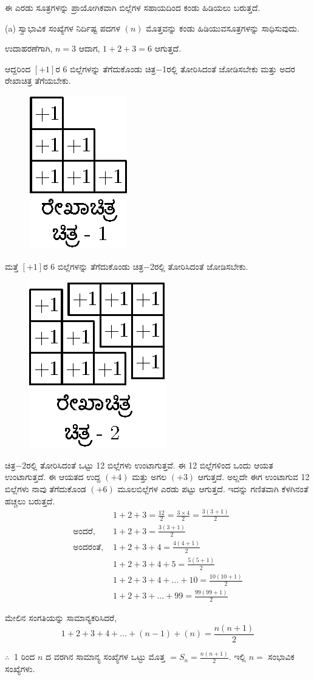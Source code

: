\eject

ಈ ಎರಡು ಸೂತ್ರಗಳನ್ನು ಪ್ರಾಯೋಗಿಕವಾಗಿ ಬಿಲ್ಲೆಗಳ ಸಹಾಯದಿಂದ ಕಂಡು ಹಿಡಿ\break ಯಲು ಬರುತ್ತದೆ. 

(a) ಸ್ವಾಭಾವಿಕ ಸಂಖ್ಯೆಗಳ ನಿರ್ದಿಷ್ಟ ಪದಗಳ $(n)$ ಮೊತ್ತವನ್ನು ಕಂಡು ಹಿಡಿಯುವ\break ಸೂತ್ರಗಳನ್ನು ಸಾಧಿಸುವುದು. 

ಉದಾಹರಣೆಗಾಗಿ, $n = 3$ ಆದಾಗ, $1 + 2 + 3 = 6$ ಆಗುತ್ತದೆ. 

ಆದ್ದರಿಂದ $[+1]$ರ 6 ಬಿಲ್ಲೆಗಳನ್ನು ತೆಗೆದುಕೊಂಡು ಚಿತ್ರ$-$1ರಲ್ಲಿ ತೋರಿಸಿದಂತೆ ಜೋಡಿಸ\-ಬೇಕು ಮತ್ತು ಅದರ ರೇಖಾಚಿತ್ರ ತೆಗೆಯಬೇಕು.
\begin{figure}[H]
\centering
\includegraphics{src/figure/chap3/fig3-57a.eps}
\end{figure}

ಮತ್ತೆ $[+1]$ರ 6 ಬಿಲ್ಲೆಗಳನ್ನು ತೆಗೆದುಕೊಂಡು ಚಿತ್ರ$-$2ರಲ್ಲಿ ತೋರಿಸಿದಂತೆ ಜೋಡಿಸ\-ಬೇಕು.
\begin{figure}[H]
\centering
\includegraphics{src/figure/chap3/fig3-57b.eps}
\end{figure}

ಚಿತ್ರ$-$2ರಲ್ಲಿ ತೋರಿಸಿದಂತೆ ಒಟ್ಟು 12 ಬಿಲ್ಲೆಗಳು ಉಂಟಾಗುತ್ತವೆ. ಈ 12 ಬಿಲ್ಲೆ\break ಗಳಿಂದ \hbox{ಒಂದು} ಆಯತ ಉಂಟಾಗುತ್ತದೆ. ಈ ಆಯತದ ಉದ್ದ $(+4)$ ಮತ್ತು ಅಗಲ $(+3)$ ಆಗುತ್ತದೆ. ಅಲ್ಲದೇ ಈಗ ಉಂಟಾಗುವ 12 ಬಿಲ್ಲೆಗಳು ನಾವು ತೆಗೆದುಕೊಂಡ $(+6)$ ಮೂಲಬಿಲ್ಲೆಗಳ ಎರಡು ಪಟ್ಟು ಆಗುತ್ತದೆ. ಇದನ್ನು ಗಣಿತವಾಗಿ ಕೆಳಗಿನಂತೆ ಹಚ್ಚಲು ಬರುತ್ತದೆ. 
\begin{align*}
& 1 + 2 + 3 = \frac{12}{2} = \frac{3 \times 4}{2} = \frac{3(3+1)}{2}\\
\text{ಅಂದರೆ, } & 1 + 2 + 3 = \frac{3(3+1)}{2}\\
\text{ಅಂದರಂತೆ, } & 1 + 2 + 3 + 4 = \frac{4(4+1)}{2}\\
& 1 + 2 + 3 + 4 + 5 = \frac{5(5+1)}{2}\\
& 1 + 2 + 3 + 4 + \hdots + 10 = \frac{10(10+1)}{2}\\
& 1 + 2 + 3 + \hdots + 99 = \frac{99(99+1)}{2}
\end{align*}

ಮೇಲಿನ ಸಂಗತಿಯನ್ನು ಸಾಮಾನ್ಯಕರಿಸಿದರೆ,
$$
1 + 2 + 3 + 4 + \hdots + (n-1) + (n) = \frac{n(n+1)}{2}
$$

$\therefore~$ 1 ರಿಂದ $n$ ದ ವರಗಿನ ಸಾಮಾನ್ಯ ಸಂಖ್ಯೆಗಳ ಒಟ್ಟು ಮೊತ್ತ $= S_{n} = \frac{n(n+1)}{2}$. ಇಲ್ಲಿ $n =$ ಸಂಭಾವಿಕ ಸಂಖ್ಯೆಗಳು. 


